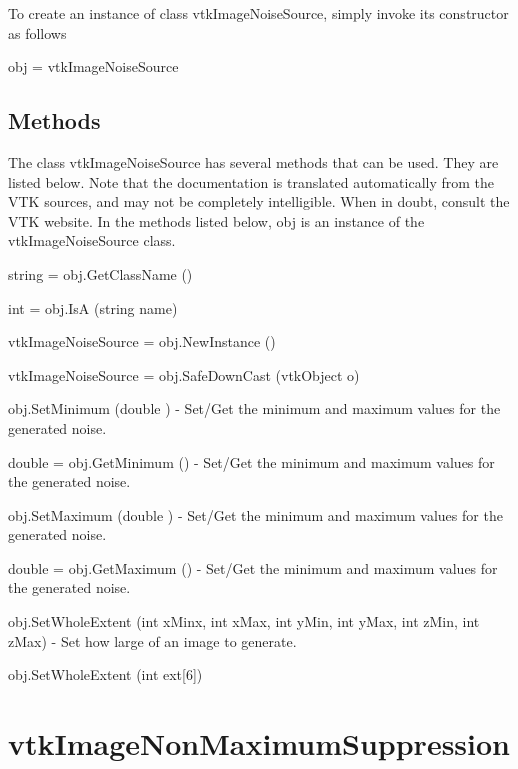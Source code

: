 To create an instance of class vtk\-Image\-Noise\-Source, simply invoke its constructor as follows \begin{DoxyVerb}  obj = vtkImageNoiseSource
\end{DoxyVerb}
 \hypertarget{vtkwidgets_vtkxyplotwidget_Methods}{}\subsection{Methods}\label{vtkwidgets_vtkxyplotwidget_Methods}
The class vtk\-Image\-Noise\-Source has several methods that can be used. They are listed below. Note that the documentation is translated automatically from the V\-T\-K sources, and may not be completely intelligible. When in doubt, consult the V\-T\-K website. In the methods listed below, {\ttfamily obj} is an instance of the vtk\-Image\-Noise\-Source class. 
\begin{DoxyItemize}
\item {\ttfamily string = obj.\-Get\-Class\-Name ()}  
\item {\ttfamily int = obj.\-Is\-A (string name)}  
\item {\ttfamily vtk\-Image\-Noise\-Source = obj.\-New\-Instance ()}  
\item {\ttfamily vtk\-Image\-Noise\-Source = obj.\-Safe\-Down\-Cast (vtk\-Object o)}  
\item {\ttfamily obj.\-Set\-Minimum (double )} -\/ Set/\-Get the minimum and maximum values for the generated noise.  
\item {\ttfamily double = obj.\-Get\-Minimum ()} -\/ Set/\-Get the minimum and maximum values for the generated noise.  
\item {\ttfamily obj.\-Set\-Maximum (double )} -\/ Set/\-Get the minimum and maximum values for the generated noise.  
\item {\ttfamily double = obj.\-Get\-Maximum ()} -\/ Set/\-Get the minimum and maximum values for the generated noise.  
\item {\ttfamily obj.\-Set\-Whole\-Extent (int x\-Minx, int x\-Max, int y\-Min, int y\-Max, int z\-Min, int z\-Max)} -\/ Set how large of an image to generate.  
\item {\ttfamily obj.\-Set\-Whole\-Extent (int ext\mbox{[}6\mbox{]})}  
\end{DoxyItemize}\hypertarget{vtkimaging_vtkimagenonmaximumsuppression}{}\section{vtk\-Image\-Non\-Maximum\-Suppression}\label{vtkimaging_vtkimagenonmaximumsuppression}
